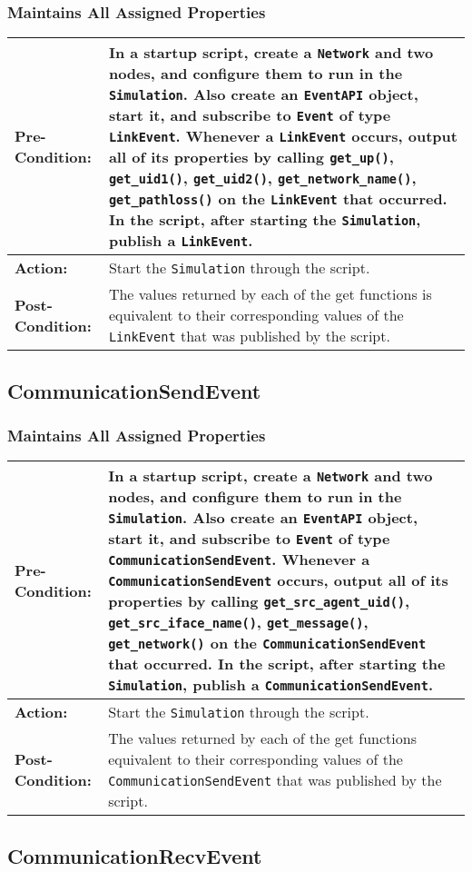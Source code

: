 \documentclass[titlepage]{article}
\newcommand{\testcase}[3]{
    \begin{center}
    \begin{tabular}{| l | p{0.7\textwidth}|}
        \hline
        \rowcolor[gray]{0.8}\textbf{Pre-Condition:} & #1 \\ \hline
        \textbf{Action:} & #2 \\ \hline
        \rowcolor[gray]{0.8}\textbf{Post-Condition:} & #3 \\ \hline
    \end{tabular}
    \end{center}
}
\begin{document}
\subsubsection{Maintains All Assigned Properties}
\testcase{In a startup script, create a \texttt{Network} and two nodes, and configure them to run in the \texttt{Simulation}. Also create an \texttt{EventAPI} object, start it, and subscribe to \texttt{Event} of type \texttt{LinkEvent}. Whenever a \texttt{LinkEvent} occurs, output all of its properties by calling \texttt{get\_up()}, \texttt{get\_uid1()}, \texttt{get\_uid2()}, \texttt{get\_network\_name()}, \texttt{get\_pathloss()} on the \texttt{LinkEvent} that occurred. In the script, after starting the \texttt{Simulation}, publish a \texttt{LinkEvent}.}{Start the \texttt{Simulation} through the script.}{The values returned by each of the get functions is equivalent to their corresponding values of the \texttt{LinkEvent} that was published by the script.}

\subsection{CommunicationSendEvent}
\subsubsection{Maintains All Assigned Properties}
\testcase{In a startup script, create a \texttt{Network} and two nodes, and configure them to run in the \texttt{Simulation}. Also create an \texttt{EventAPI} object, start it, and subscribe to \texttt{Event} of type \texttt{CommunicationSendEvent}. Whenever a \texttt{CommunicationSendEvent} occurs, output all of its properties by calling \texttt{get\_src\_agent\_uid()}, \texttt{get\_src\_iface\_name()}, \texttt{get\_message()}, \texttt{get\_network()} on the \texttt{CommunicationSendEvent} that occurred. In the script, after starting the \texttt{Simulation}, publish a \texttt{CommunicationSendEvent}.}{Start the \texttt{Simulation} through the script.}{The values returned by each of the get functions equivalent to their corresponding values of the \texttt{CommunicationSendEvent} that was published by the script.}

\subsection{CommunicationRecvEvent}
\end{document}
